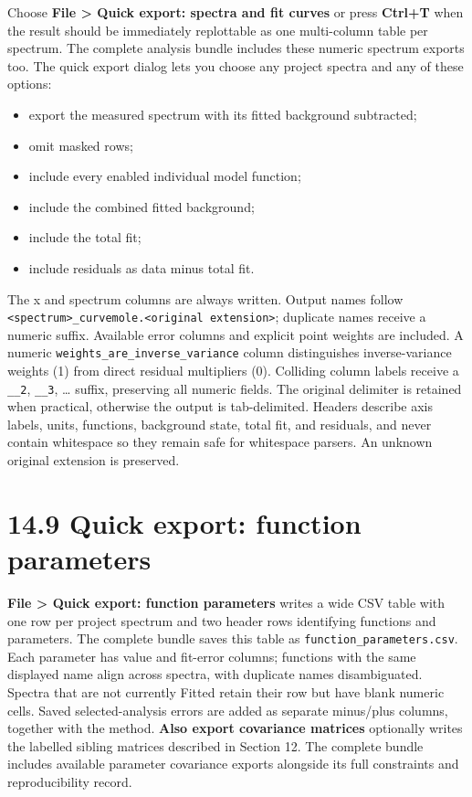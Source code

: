 \documentclass[
  10pt,
  a4paper,
  oneside]{scrreprt}
\providecommand{\tightlist}{%
  \setlength{\itemsep}{0pt}\setlength{\parskip}{0pt}}
\begin{document}
Choose \textbf{File \textgreater{} Quick export: spectra and fit curves}
or press \textbf{Ctrl+T} when the result should be immediately
replottable as one multi-column table per spectrum. The complete
analysis bundle includes these numeric spectrum exports too. The quick
export dialog lets you choose any project spectra and any of these
options:

\begin{itemize}
\tightlist
\item
  export the measured spectrum with its fitted background subtracted;
\item
  omit masked rows;
\item
  include every enabled individual model function;
\item
  include the combined fitted background;
\item
  include the total fit;
\item
  include residuals as data minus total fit.
\end{itemize}

The x and spectrum columns are always written. Output names follow
\texttt{\textless{}spectrum\textgreater{}\_curvemole.\textless{}original\ extension\textgreater{}};
duplicate names receive a numeric suffix. Available error columns and
explicit point weights are included. A numeric
\texttt{weights\_are\_inverse\_variance} column distinguishes
inverse-variance weights (1) from direct residual multipliers (0).
Colliding column labels receive a \texttt{\_\_2}, \texttt{\_\_3},
\ldots{} suffix, preserving all numeric fields. The original delimiter
is retained when practical, otherwise the output is tab-delimited.
Headers describe axis labels, units, functions, background state, total
fit, and residuals, and never contain whitespace so they remain safe for
whitespace parsers. An unknown original extension is preserved.

\hypertarget{quick-export-function-parameters}{%
\section{14.9 Quick export: function
parameters}\label{quick-export-function-parameters}}

\textbf{File \textgreater{} Quick export: function parameters} writes a
wide CSV table with one row per project spectrum and two header rows
identifying functions and parameters. The complete bundle saves this
table as \texttt{function\_parameters.csv}. Each parameter has value and
fit-error columns; functions with the same displayed name align across
spectra, with duplicate names disambiguated. Spectra that are not
currently Fitted retain their row but have blank numeric cells. Saved
selected-analysis errors are added as separate minus/plus columns,
together with the method. \textbf{Also export covariance matrices}
optionally writes the labelled sibling matrices described in Section 12.
The complete bundle includes available parameter covariance exports
alongside its full constraints and reproducibility record.
\end{document}
